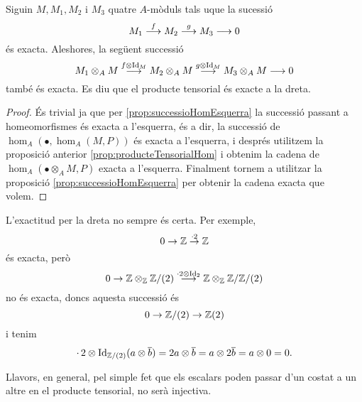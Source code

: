 \documentclass[../../../main.tex]{subfiles}
\begin{document}
\begin{prop}
\label{prop:producteTensorialExacte} Siguin $M,M_1,M_2$ i $M_3$ quatre $A$-mòduls tals uque la sucessió
\begin{equation}
    \notag
    M_1\overset{f}{\longrightarrow}M_2\overset{g}{\longrightarrow}M_3\longrightarrow 0
\end{equation}
és exacta. Aleshores, la següent successió
\begin{equation}
    \notag
    M_1\otimes_AM\overset{f\otimes\operatorname{Id}_M}{\longrightarrow}M_2\otimes_AM\overset{g\otimes\operatorname{Id}_M}{\longrightarrow}M_3\otimes_AM\longrightarrow 0
\end{equation}
també és exacta. Es diu que el producte tensorial és exacte a la dreta.
\end{prop}
\begin{proof}
És trivial ja que per \ref{prop:successioHomEsquerra} la successió passant a homeomorfismes és exacta a l'esquerra, és a dir, la successió de $\hom_A(\bullet,\hom_A(M,P))$ és exacta a l'esquerra, i després utilitzem la proposició anterior \ref{prop:producteTensorialHom} i obtenim la cadena de $\hom_A(\bullet\otimes_AM,P)$ exacta a l'esquerra. Finalment tornem a utilitzar la proposició \ref{prop:successioHomEsquerra} per obtenir la cadena exacta que volem.
\end{proof}




\begin{nota}
L'exactitud per la dreta no sempre és certa. Per exemple,
\begin{equation}
    \notag
    0\to\mathbb{Z}\overset{\cdotp 2}{\to}\mathbb{Z}
\end{equation}
és exacta, però
\begin{equation}
    \notag
    0\to \mathbb{Z}\otimes_\mathbb{Z}\mathbb{Z}/(2)\overset{\cdotp 2\otimes \operatorname{Id}_2}{\longrightarrow}\mathbb{Z}\otimes_\mathbb{Z}\mathbb{Z}/\mathbb{Z}/(2)    
\end{equation}
no és exacta, doncs aquesta successió és
\begin{equation}
    \notag
    0\to \mathbb{Z}/(2)\to\mathbb{Z}(2)
\end{equation}
i tenim
\begin{equation}
    \notag
    \cdotp2\otimes\operatorname{Id}_{\mathbb{Z}/(2)}(a\otimes\overline{b}) = 2a\otimes\overline{b} = a\otimes2\overline{b} = a\otimes 0 = 0.
\end{equation}
\end{nota}

Llavors, en general, pel simple fet que els escalars poden passar d'un costat a un altre en el producte tensorial, no serà injectiva.
\end{document}
